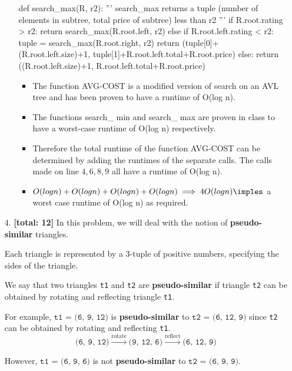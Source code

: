 \documentclass{assignment-263}
\begin{document}
\begin{enumerate}
\begin{enumerate}[(a)]
\begin{python}
def search_max(R, r2):
    '''
  search_max returns a tuple (number of elements in subtree, 
  total price of subtree) less than r2
  '''
  if R.root.rating > r2:
    return search_max(R.root.left, r2)
  else if R.root.left.rating < r2:
    tuple = search_max(R.root.right, r2)
    return (tuple[0]+(R.root.left.size)+1, tuple[1]+R.root.left.total+R.root.price)
  else:
    return ((R.root.left.size)+1, R.root.left.total+R.root.price)
\end{python}
    \vskip10pt
    \begin{itemize}
    \item The function AVG-COST is a modified version of search on an AVL tree and has been proven to have a runtime of O(log n). 
    \item The functions search\_ min and search\_ max are proven in class to have a worst-case runtime of O(log n) respectively.
    \item Therefore the total runtime of the function AVG-COST can be determined by adding the runtimes of the separate calls. The calls made on line $4, 6, 8, 9$ all have a runtime of O(log n). 
    \item$O(log n) + O(log n)+ O(log n) + O(log n) \implies 4O(log n) \imples$ a worst case runtime of O(log n) as required.
    \end{itemize}
  \end{enumerate}


  
 \clearpage
\program

\item[4.] \textbf{[total: 12]}
  In this problem, we will deal with the notion
  of \textbf{pseudo-similar} triangles.

  Each triangle is represented by a 3-tuple of positive numbers,
  specifying the sides of the triangle.

  We say that two triangles \texttt{t1} and \texttt{t2} are
  \textbf{pseudo-similar} if triangle \texttt{t2} can be obtained by
  rotating and reflecting triangle \texttt{t1}.

  For example, $\texttt{t1 = (6, 9, 12)}$ is \textbf{pseudo-similar}
  to $\texttt{t2 = (6, 12, 9)}$ since \texttt{t2} can be obtained by
  rotating and reflecting \texttt{t1}.
%
  \[ \texttt{(6, 9, 12)}
    \xrightarrow{\text{rotate}} \texttt{(9, 12, 6)}
    \xrightarrow{\text{reflect}} \texttt{(6, 12, 9)}
  \]

  However, $\texttt{t1 = (6, 9, 6)}$ is not \textbf{pseudo-similar} to
  $\texttt{t2 = (6, 9, 9)}.$


\end{enumerate}
\end{document}
